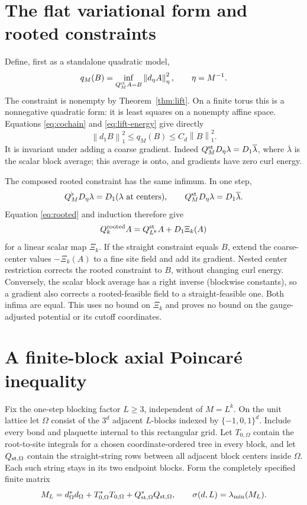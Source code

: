 \documentclass[11pt]{article}
\theoremstyle{remark}
\newcommand{\norm}[1]{\left\|#1\right\|}
\begin{document}
\section{The flat variational form and rooted constraints}

Define, first as a standalone quadratic model,
\begin{equation}\label{eq:qmin}
 q_M(B)=\inf_{Q_M^{\rm st}A=B}\norm{d_\eta A}_\eta^2,
 \qquad\eta=M^{-1}.
\end{equation}
The constraint is nonempty by Theorem~\ref{thm:lift}. On a finite
torus this is a nonnegative quadratic form: it is least squares
on a nonempty affine space. Equations \eqref{eq:cochain} and
\eqref{eq:lift-energy} give directly
\begin{equation}\label{eq:energy-sandwich}
 \norm{d_1B}_1^2\le q_M(B)\le C_d\norm B_1^2.
\end{equation}
It is invariant under adding a coarse gradient. Indeed
$Q_M^{\rm st}D_\eta\lambda=D_1\overline\lambda$, where
$\overline\lambda$ is the scalar block average; this average is
onto, and gradients have zero curl energy.

The composed rooted constraint has the same infimum. In one step,
\[
 Q_M^\flat D_\eta\lambda=D_1(\lambda\hbox{ at centers}),
 \qquad
 Q_M^{\rm st}D_\eta\lambda=D_1\overline\lambda.
\]
Equation \eqref{eq:rooted} and induction therefore give
\[
 Q_k^{\rm rooted}A=Q_{L^k}^{\rm st}A+D_1\Xi_k(A)
\]
for a linear scalar map $\Xi_k$. If the straight constraint equals
$B$, extend the coarse-center values $-\Xi_k(A)$ to a fine site
field and add its gradient. Nested center restriction corrects the
rooted constraint to $B$, without changing curl energy. Conversely,
the scalar block average has a right inverse (blockwise constants),
so a gradient also corrects a rooted-feasible field to a
straight-feasible one. Both infima are equal. This uses no bound
on $\Xi_k$ and proves no bound on the gauge-adjusted potential or
its cutoff coordinates.

\section{A finite-block axial Poincar\'e inequality}

Fix the one-step blocking factor $L\ge3$, independent of $M=L^k$.
On the unit lattice let $\Omega$ consist of the $3^d$ adjacent
$L$-blocks indexed by $\{-1,0,1\}^d$. Include every bond and
plaquette internal to this rectangular grid. Let $T_{0,\Omega}$
contain the root-to-site integrals for a chosen coordinate-ordered
tree in every block, and let $Q_{{\rm st},\Omega}$ contain the
straight-string rows between all adjacent block centers inside
$\Omega$. Each such string stays in its two endpoint blocks.
Form the completely specified finite matrix
\[
 M_L=d_\Omega^*d_\Omega
       +T_{0,\Omega}^*T_{0,\Omega}
       +Q_{{\rm st},\Omega}^*Q_{{\rm st},\Omega},
 \qquad \sigma(d,L)=\lambda_{\min}(M_L).
\]
\end{document}
